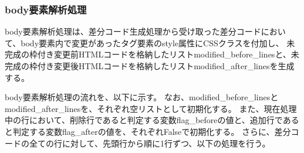 \subsubsection{body要素解析処理}\label{subsubsec: body_analysis}
body要素解析処理は、差分コード生成処理から受け取った差分コードにおいて、body要素内で変更があったタグ要素のstyle属性にCSSクラス\cite{CssSelector}を付加し、
未完成の枠付き変更前HTMLコードを格納したリストmodified\_before\_linesと、未完成の枠付き変更後HTMLコードを格納したリストmodified\_after\_linesを生成する。
\par
body要素解析処理の流れを、以下に示す。
なお、modified\_before\_linesとmodified\_after\_linesを、それぞれ空リストとして初期化する。
また、現在処理中の行において、削除行であると判定する変数flag\_beforeの値と、追加行であると判定する変数flag\_afterの値を、それぞれFalseで初期化する。
さらに、差分コードの全ての行に対して、先頭行から順に1行ずつ、以下の処理を行う。
